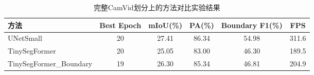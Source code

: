 \begin{table}[H]
\centering
\caption{完整CamVid划分上的方法对比实验结果}
\label{tab:camvid_benchmark_real}
\begin{tabular}{lccccc}
\toprule
方法 & Best Epoch & mIoU(\%) & PA(\%) & Boundary F1(\%) & FPS \\
\midrule
UNetSmall & 20 & 27.41 & 86.34 & 54.98 & 311.6 \\
TinySegFormer & 20 & 25.05 & 83.00 & 46.30 & 189.5 \\
TinySegFormer_Boundary & 19 & 26.30 & 85.34 & 46.81 & 204.9 \\
\bottomrule
\end{tabular}
\end{table}
